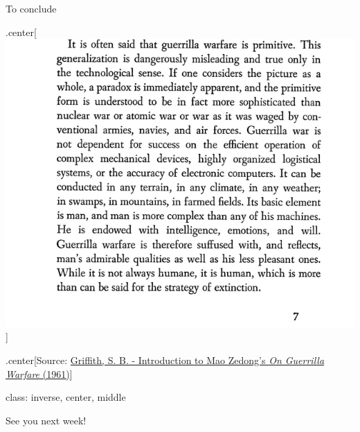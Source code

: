 \documentclass[ignorenonframetext,]{beamer}
\begin{document}
\begin{frame}{To conclude}

.center{[}\includegraphics{griffith.png}{]}

\begin{block}{.center{[}Source:
\href{https://books.google.com/books?id=jKoqAwAAQBAJ\&lpg=PA7\&dq=griffith\%20\%22its\%20basic\%20element\%20is\%22\&pg=PA7\#v=onepage\&q\&f=false}{Griffith,
S. B. - Introduction to Mao Zedong's \emph{On Guerrilla Warfare}
(1961)}{]}}

class: inverse, center, middle

\end{block}

\end{frame}

\begin{frame}{See you next week!}

\end{frame}
\end{document}
